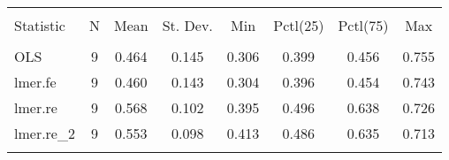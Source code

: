 
\begin{table}[!htbp] \centering 
  \caption{} 
  \label{} 
\begin{tabular}{@{\extracolsep{5pt}}lccccccc} 
\\[-1.8ex]\hline 
\hline \\[-1.8ex] 
Statistic & \multicolumn{1}{c}{N} & \multicolumn{1}{c}{Mean} & \multicolumn{1}{c}{St. Dev.} & \multicolumn{1}{c}{Min} & \multicolumn{1}{c}{Pctl(25)} & \multicolumn{1}{c}{Pctl(75)} & \multicolumn{1}{c}{Max} \\ 
\hline \\[-1.8ex] 
OLS & 9 & 0.464 & 0.145 & 0.306 & 0.399 & 0.456 & 0.755 \\ 
lmer.fe & 9 & 0.460 & 0.143 & 0.304 & 0.396 & 0.454 & 0.743 \\ 
lmer.re & 9 & 0.568 & 0.102 & 0.395 & 0.496 & 0.638 & 0.726 \\ 
lmer.re\_2 & 9 & 0.553 & 0.098 & 0.413 & 0.486 & 0.635 & 0.713 \\ 
\hline \\[-1.8ex] 
\end{tabular} 
\end{table} 
